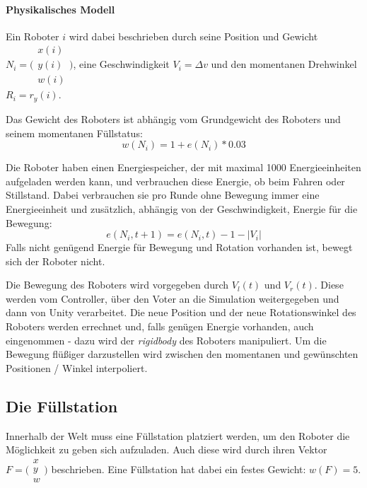 \paragraph{Physikalisches Modell}
Ein Roboter $i$ wird dabei beschrieben durch seine Position und Gewicht
$ N_i = \bigl(\begin{smallmatrix} x(i) \\ y(i) \\ w(i) \end{smallmatrix}\bigr)$, eine
Geschwindigkeit $ V_i = \Delta v $ und den momentanen Drehwinkel
$ R_i = r_y(i)$. 

Das Gewicht des Roboters ist abh{\"{a}}ngig vom Grundgewicht des Roboters und seinem momentanen F{\"{u}}llstatus: 
\begin{equation}
    \label{eq:w}
 w(N_i) = 1 + e(N_i) * 0.03
\end{equation}

Die Roboter haben einen Energiespeicher, der mit maximal 1000 Energieeinheiten
aufgeladen werden kann, und verbrauchen diese Energie, ob beim Fahren oder
Stillstand. Dabei verbrauchen sie pro Runde ohne Bewegung immer eine Energieeinheit und zus{\"{a}}tzlich, abh{\"{a}}ngig von der Geschwindigkeit, Energie f{\"{u}}r die Bewegung:
\begin{equation}
    \label{eq:entladen}
	e(N_i, t + 1) = e(N_i, t) - 1 - |V_i|
\end{equation}
Falls nicht gen{\"{u}}gend Energie f{\"{u}}r Bewegung und Rotation vorhanden ist, bewegt sich der Roboter nicht.

Die Bewegung des Roboters wird vorgegeben durch $V_l(t)$ und $ V_r(t)$. Diese werden vom Controller, {\"{u}}ber den Voter an die Simulation weitergegeben und dann von Unity verarbeitet.
Die neue Position und der neue Rotationswinkel des Roboters werden errechnet und, falls gen{\"{u}}gen Energie
vorhanden, auch eingenommen - dazu wird der \textit{rigidbody} des Roboters manipuliert.
Um die Bewegung fl{\"{u}}{\ss}iger darzustellen wird zwischen den momentanen und gew{\"{u}}nschten Positionen / Winkel interpoliert.

\subsection{Die F{\"{u}}llstation}\label{fuelstation}
Innerhalb der Welt muss eine F{\"{u}}llstation platziert werden, um den Roboter die M{\"{o}}glichkeit zu geben sich aufzuladen. Auch diese wird durch ihren Vektor $ F = \bigl(\begin{smallmatrix} x \\ y \\ w \end{smallmatrix}\bigr)$ beschrieben. Eine F{\"{u}}llstation hat dabei ein festes Gewicht: $ w(F) = 5 $.

